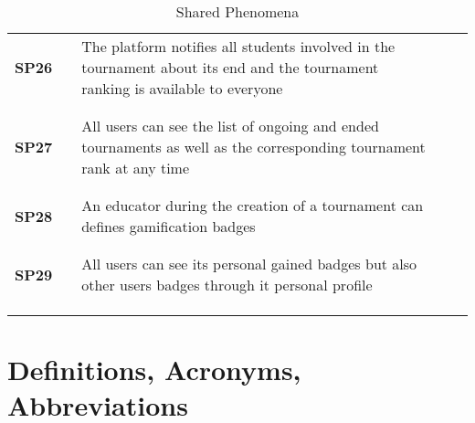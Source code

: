 \begin{longtable}[H]{l l p{8.5cm} l l}
    \textbf{SP26} & \vline & The platform notifies all students involved in the tournament about its end and the tournament ranking is available to everyone                              & \vline &                        \\
                  &        &                                                                                                          &        &                        \\\hline & & & & \\
    \textbf{SP27} & \vline & All users can see the list of ongoing and ended tournaments as well as the corresponding tournament rank at any time              & \vline &                        \\
                  &        &                                                                                                          &        &                        \\\hline & & & & \\
    \textbf{SP28} & \vline & An educator during the creation of a tournament can defines gamification badges                                                              & \vline &                        \\
                  &        &                                                                                                          &        &                        \\\hline & & & & \\
    \textbf{SP29} & \vline & All users can see its personal gained badges but also other users badges through it personal profile                                                           & \vline &                        \\
                  &        &                                                                                                          &        &                        \\
    \hline        &        &                                                                                                          &        &                        \\
    \caption{Shared Phenomena}
\end{longtable}

\section{Definitions, Acronyms, Abbreviations}

